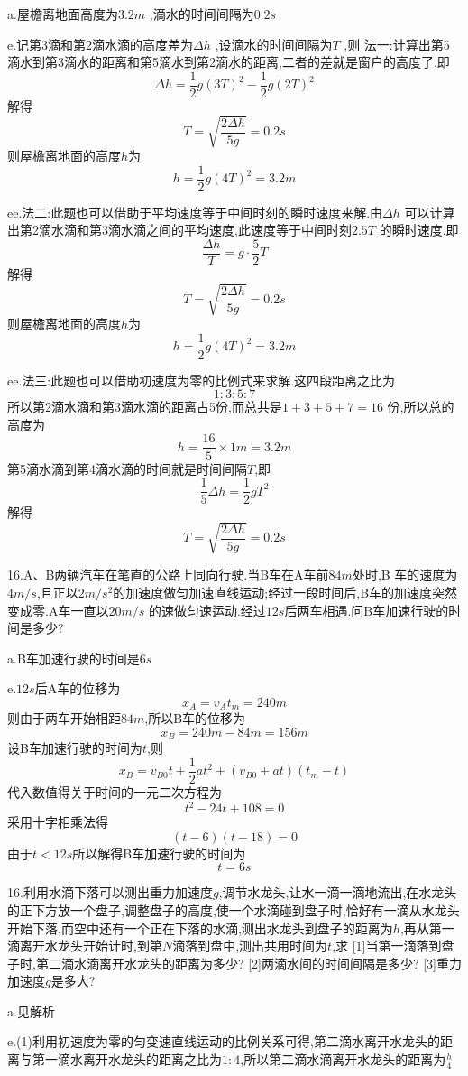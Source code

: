 \begin{calculate}
a.屋檐离地面高度为$3.2m$ ,滴水的时间间隔为$0.2s$

e.记第3滴和第2滴水滴的高度差为$\Delta h$ ,设滴水的时间间隔为$T$ ,则
法一:计算出第5滴水到第3滴水的距离和第5滴水到第2滴水的距离,二者的差就是窗户的高度了.即
$$\Delta h=\frac{1}{2}g(3T)^2-\frac{1}{2}g(2T)^2$$
解得
$$T=\sqrt{\frac{2\Delta h}{5g}}=0.2s$$
则屋檐离地面的高度$h$为
$$h=\frac{1}{2}g(4T)^2=3.2m$$

ee.法二:此题也可以借助于平均速度等于中间时刻的瞬时速度来解.由$\Delta h$ 可以计算出第2滴水滴和第3滴水滴之间的平均速度,此速度等于中间时刻$2.5T$ 的瞬时速度,即
$$\frac{\Delta h}{T}=g\cdot \frac{5}{2}T$$
解得
$$T=\sqrt{\frac{2\Delta h}{5g}}=0.2s$$
则屋檐离地面的高度$h$为
$$h=\frac{1}{2}g(4T)^2=3.2m$$

ee.法三:此题也可以借助初速度为零的比例式来求解.这四段距离之比为
$$1:3:5:7$$
所以第2滴水滴和第3滴水滴的距离占5份,而总共是$1+3+5+7=16$ 份,所以总的高度为
$$h=\frac{16}{5}\times 1m=3.2m$$
第5滴水滴到第4滴水滴的时间就是时间间隔$T$,即
$$\frac{1}{5}\Delta h=\frac{1}{2}gT^2$$
解得
$$T=\sqrt{\frac{2\Delta h}{5g}}=0.2s$$

16.A、B两辆汽车在笔直的公路上同向行驶.当B车在A车前$84m$处时,B 车的速度为$4m/s$,且正以$2m/s^2$的加速度做匀加速直线运动;经过一段时间后,B车的加速度突然变成零.A车一直以$20m/s$ 的速做匀速运动.经过$12s$后两车相遇.问B车加速行驶的时间是多少?

a.B车加速行驶的时间是$6s$

e.$12s$后A车的位移为
$$x_A=v_At_m=240m$$
则由于两车开始相距$84m$,所以B车的位移为
$$x_B=240m-84m=156m$$
设B车加速行驶的时间为$t$,则
$$x_B=v_{B0}t+\frac{1}{2}at^2+(v_{B0}+at)(t_m-t)$$
代入数值得关于时间的一元二次方程为
$$t^2-24t+108=0$$
采用十字相乘法得
$$(t-6)(t-18)=0$$
由于$t<12s$所以解得B车加速行驶的时间为
$$t=6s$$

16.利用水滴下落可以测出重力加速度$g$,调节水龙头,让水一滴一滴地流出,在水龙头的正下方放一个盘子,调整盘子的高度,使一个水滴碰到盘子时,恰好有一滴从水龙头开始下落,而空中还有一个正在下落的水滴,测出水龙头到盘子的距离为$h$,再从第一滴离开水龙头开始计时,到第$N$滴落到盘中,测出共用时间为$t$,求
[1]当第一滴落到盘子时,第二滴水滴离开水龙头的距离为多少?
[2]两滴水间的时间间隔是多少?
[3]重力加速度$g$是多大?

a.见解析

e.(1)利用初速度为零的匀变速直线运动的比例关系可得,第二滴水离开水龙头的距离与第一滴水离开水龙头的距离之比为$1:4$,所以第二滴水滴离开水龙头的距离为$\frac{h}{4}$


\end{calculate}
